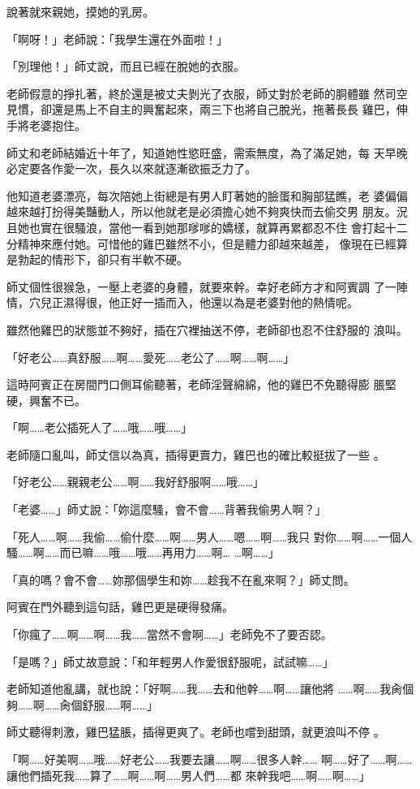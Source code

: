 說著就來親她，摸她的乳房。

「啊呀！」老師說：「我學生還在外面啦！」

「別理他！」師丈說，而且已經在脫她的衣服。

老師假意的掙扎著，終於還是被丈夫剝光了衣服，師丈對於老師的胴體雖
然司空見慣，卻還是馬上不自主的興奮起來，兩三下也將自己脫光，拖著長長
雞巴，伸手將老婆抱住。

師丈和老師結婚近十年了，知道她性慾旺盛，需索無度，為了滿足她，每
天早晚必定要各作愛一次，長久以來就逐漸欲振乏力了。

他知道老婆漂亮，每次陪她上街總是有男人盯著她的臉蛋和胸部猛瞧，老
婆偏偏越來越打扮得美豔動人，所以他就老是必須擔心她不夠爽快而去偷交男
朋友。況且她也實在很騷浪，當他一看到她那嗲嗲的嬌樣，就算再累都忍不住
會打起十二分精神來應付她。可惜他的雞巴雖然不小，但是體力卻越來越差，
像現在已經算是勃起的情形下，卻只有半軟不硬。

師丈個性很猴急，一壓上老婆的身體，就要來幹。幸好老師方才和阿賓調
了一陣情，穴兒正濕得很，他正好一插而入，他還以為是老婆對他的熱情呢。

雖然他雞巴的狀態並不夠好，插在穴裡抽送不停，老師卻也忍不住舒服的
浪叫。

「好老公……真舒服……啊……愛死……老公了……啊……啊……」

這時阿賓正在房間門口側耳偷聽著，老師淫聲綿綿，他的雞巴不免聽得膨
脹堅硬，興奮不已。

「啊……老公插死人了……哦……哦……」

老師隨口亂叫，師丈信以為真，插得更賣力，雞巴也的確比較挺拔了一些
。

「好老公……親親老公……啊……我好舒服啊……哦……」

「老婆……」師丈說：「妳這麼騷，會不會……背著我偷男人啊？」

「死人……啊……我偷……偷什麼……啊……男人……嗯……啊……我只
對你……啊……一個人騷……啊……而已嘛……哦……哦……再用力……啊…
…啊……」

「真的嗎？會不會……妳那個學生和妳……趁我不在亂來啊？」師丈問。

阿賓在門外聽到這句話，雞巴更是硬得發痛。

「你瘋了……啊……啊……我……當然不會啊……」老師免不了要否認。

「是嗎？」師丈故意說：「和年輕男人作愛很舒服呢，試試嘛……」

老師知道他亂講，就也說：「好啊……我……去和他幹……啊……讓他將
……啊……我肏個夠……啊……肏個舒服……啊……」

師丈聽得刺激，雞巴猛脹，插得更爽了。老師也嚐到甜頭，就更浪叫不停
。

「啊……好美啊……哦……好老公……我要去讓……啊……很多人幹……
啊……好了……啊……讓他們插死我……算了……啊……啊……男人們……都
來幹我吧……啊……啊……」

